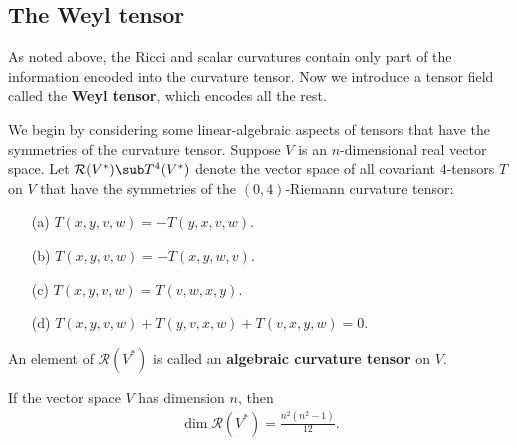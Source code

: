 \subsection{The Weyl tensor}
As noted above, the Ricci and scalar curvatures contain only part of the information encoded into the curvature tensor. Now we introduce a tensor field called the 
\textbf{Weyl tensor}, which encodes all the rest.\par
We begin by considering some linear-algebraic aspects of tensors that have the symmetries of the curvature tensor. Suppose $V$ is an $n$-dimensional real vector space. 
Let $\mathcal{R}(V^*)\sub T^4(V^*)$ denote the vector space of all covariant $4$-tensors $T$ on $V$ that have the symmetries of the $(0,4)$-Riemann curvature tensor:
\begin{itemize}
\item[(a)] $T(x,y,v,w)=-T(y,x,v,w)$.
\item[(b)] $T(x,y,v,w)=-T(x,y,w,v)$.
\item[(c)] $T(x,y,v,w)=T(v,w,x,y)$.
\item[(d)] $T(x,y,v,w)+T(y,v,x,w)+T(v,x,y,w)=0$.
\end{itemize}
An element of $\mathcal{R}(V^*)$ is called an \textbf{algebraic curvature tensor} on $V$.
\begin{proposition}
If the vector space $V$ has dimension $n$, then
\begin{align}\label{Riemann algebraic curvature dim}
\dim\mathcal{R}(V^*)=\frac{n^2(n^2-1)}{12}.
\end{align}
\end{proposition}
